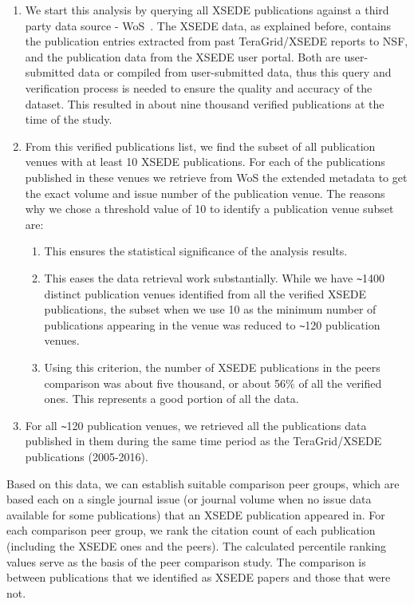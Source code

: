 \documentclass[sigconf]{acmart}
\begin{document}
\begin{enumerate}
\item We start this analysis by querying all XSEDE publications
  against a third party data source - WoS~\cite{www-isiwos}. The XSEDE
  data, as explained before, contains the publication entries
  extracted from past TeraGrid/XSEDE reports to NSF, and the
  publication data from the XSEDE user portal. Both are user-submitted
  data or compiled from user-submitted data, thus this query and
  verification process is needed to ensure the quality and accuracy of
  the dataset.  This resulted in about nine thousand verified
  publications at the time of the study.

\item From this verified publications list, we find the subset of all
  publication venues with at least 10 XSEDE publications. For each of
  the publications published in these venues we retrieve from WoS the
  extended metadata to get the exact volume and issue number of the
  publication venue. The reasons why we chose a threshold value of 10
  to identify a publication venue subset are:

  \begin{enumerate}
  \item This ensures the statistical significance of the analysis
    results.
  \item This eases the data retrieval work substantially. While we
    have \verb|~|1400 distinct publication venues identified from all the
    verified XSEDE publications, the subset when we use 10 as the
    minimum number of publications appearing in the venue was reduced
    to \verb|~|120 publication venues.
  \item Using this criterion, the number of XSEDE publications in the
    peers comparison was about five thousand, or about 56\% of all the
    verified ones. This represents a good portion of all the data.
  \end{enumerate}

\item For all \verb|~|120 publication venues, we retrieved all the
  publications data published in them during the same time period as
  the TeraGrid/XSEDE publications (2005-2016).
\end{enumerate}

Based on this data, we can establish suitable comparison peer groups,
which are based each on a single journal issue (or journal volume when
no issue data available for some publications) that an XSEDE
publication appeared in. For each comparison peer group, we rank the
citation count of each publication (including the XSEDE ones and the
peers). The calculated percentile ranking values serve as the basis of
the peer comparison study. The comparison is between publications that
we identified as XSEDE papers and those that were not.
\end{document}
